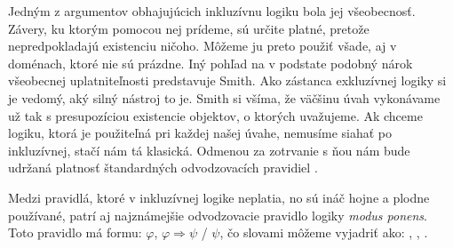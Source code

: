 \documentclass[12pt, letterpaper]{article}
\begin{document}
Jedným z argumentov obhajujúcich inkluzívnu logiku bola jej všeobecnosť. Závery, ku ktorým pomocou nej prídeme, sú určite platné, pretože nepredpokladajú existenciu ničoho. Môžeme ju preto použiť všade, aj v doménach, ktoré nie sú prázdne. Iný pohľad na v podstate podobný nárok všeobecnej uplatniteľnosti predstavuje Smith. Ako zástanca exkluzívnej logiky si je vedomý, aký silný nástroj to je. Smith si všíma, že väčšinu úvah vykonávame už tak s presupozíciou existencie objektov, o ktorých uvažujeme. Ak chceme logiku, ktorá je použiteľná pri každej našej úvahe, nemusíme siahať po inkluzívnej, stačí nám tá klasická. Odmenou za zotrvanie s ňou nám bude udržaná platnosť štandardných odvodzovacích pravidiel \parencites[329--332]{Smith2020}.\par

Medzi pravidlá, ktoré v inkluzívnej logike neplatia, no sú ináč hojne a plodne používané, patrí aj najznámejšie odvodzovacie pravidlo logiky \textit{modus ponens}. Toto pravidlo má formu: $\varphi$, $\varphi \Rightarrow \psi$  /  $\psi$, čo slovami môžeme vyjadriť ako: , ,  \parencites[30, 157]{svejdar_logika_2002}.\par

\end{document}
